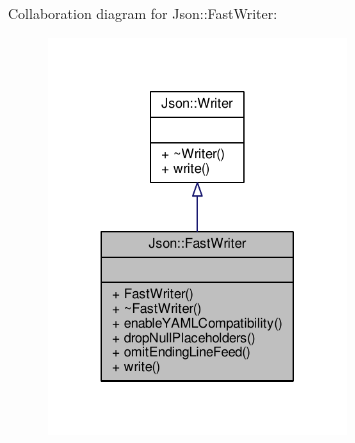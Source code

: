 Collaboration diagram for Json\+:\+:Fast\+Writer\+:
\nopagebreak
\begin{figure}[H]
\begin{center}
\leavevmode
\includegraphics[width=224pt]{db/d39/classJson_1_1FastWriter__coll__graph}
\end{center}
\end{figure}
